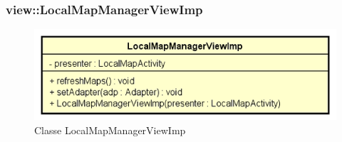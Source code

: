 \documentclass[../DefinizioneDiProdotto.tex]{subfiles}
\begin{document}
\subsubsection{view::LocalMapManagerViewImp}

    \begin{figure}[H]
        \centering
        \includegraphics{img/LocalMapManagerViewImp.png}
        \caption{Classe LocalMapManagerViewImp}\label{fig:view::LocalMapManagerViewImp} 
    \end{figure}
\end{document}
